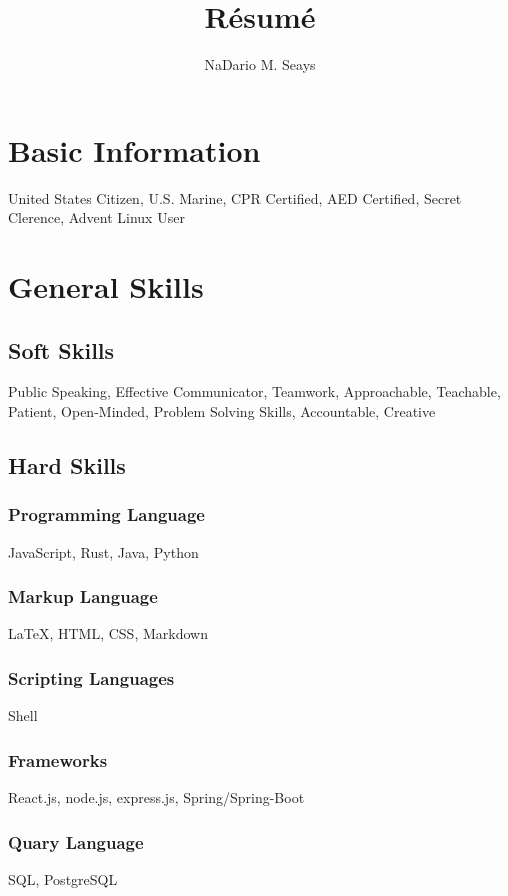 \documentclass{article}
\begin{document}
\title{R\'esum\'e}
\author{NaDario M. Seays}

\maketitle

\section{Basic Information}
United States Citizen, U.S. Marine, CPR Certified, AED Certified, Secret
Clerence, Advent Linux User

\section{General Skills}

\subsection{Soft Skills}
Public Speaking, Effective Communicator, Teamwork, Approachable, Teachable,
Patient, Open-Minded, Problem Solving Skills, Accountable, Creative


\subsection{Hard Skills}
\subsubsection{Programming Language}
JavaScript, Rust, Java, Python

\subsubsection{Markup Language}
{\LaTeX}, HTML, CSS, Markdown

\subsubsection{Scripting Languages}
Shell

\subsubsection{Frameworks}
React.js, node.js, express.js, Spring/Spring-Boot

\subsubsection{Quary Language}
SQL, PostgreSQL
\end{document}
